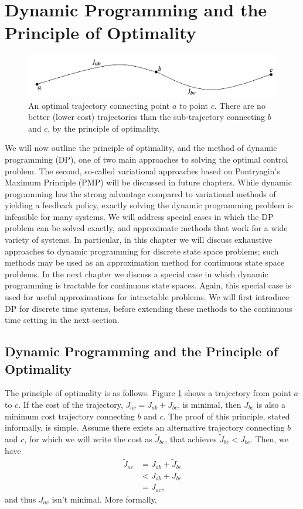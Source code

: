 \section{Dynamic Programming and the Principle of Optimality}

\begin{figure}[t]
    \centering
    \includegraphics[width=0.8\linewidth]{figs/optimality.png}
    \caption{An optimal trajectory connecting point $a$ to point $c$. There are no better (lower cost) trajectories than the sub-trajectory connecting $b$ and $c$, by the principle of optimality.}
    \label{fig:opt1}
\end{figure}

We will now outline the principle of optimality, and the method of dynamic programming (DP), one of two main approaches to solving the optimal control problem. The second, so-called variational approaches based on Pontryagin's Maximum Principle (PMP) will be discussed in future chapters. While dynamic programming has the strong advantage compared to variational methods of yielding a feedback policy, exactly solving the dynamic programming problem is infeasible for many systems. We will address special cases in which the DP problem can be solved exactly, and approximate methods that work for a wide variety of systems. In particular, in this chapter we will discuss exhaustive approaches to dynamic programming for discrete state space problems; such methods may be used as an approximation method for continuous state space problems. In the next chapter we discuss a special case in which dynamic programming is tractable for continuous state spaces. Again, this special case is used for useful approximations for intractable problems. 
We will first introduce DP for discrete time systems, before extending these methods to the continuous time setting in the next section.

\subsection{Dynamic Programming and the Principle of Optimality}

The principle of optimality is as follows. Figure \ref{fig:opt1} shows a trajectory from point $a$ to $c$. If the cost of the trajectory, $J_{ac} = J_{ab} + J_{bc}$, is minimal, then $J_{bc}$ is also a minimum cost trajectory connecting $b$ and $c$. The proof of this principle, stated informally, is simple. Assume there exists an alternative trajectory connecting $b$ and $c$, for which we will write the cost as $\tilde{J}_{bc}$, that achieves $\tilde{J}_{bc} < J_{bc}$. Then, we have 
\begin{align}
    \tilde{J}_{ac} &= J_{ab} + \tilde{J}_{bc}\\
    &< J_{ab} + J_{bc}\\
    &= J_{ac},
\end{align}
and thus $J_{ac}$ isn't minimal. More formally,

